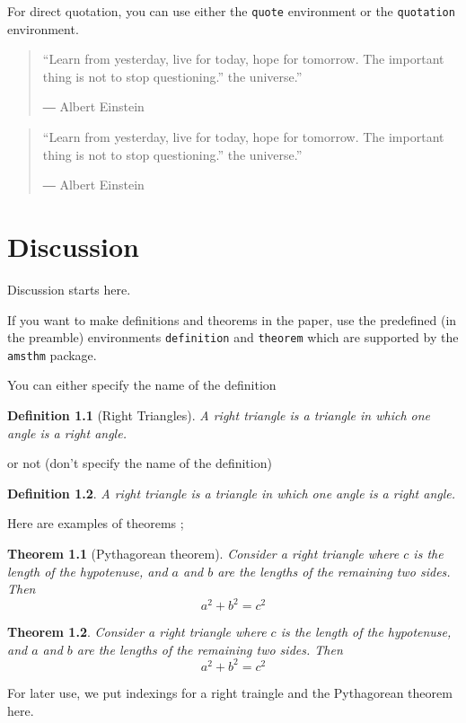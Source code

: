 \documentclass{report}
\newtheorem{theorem}{Theorem} %
\newtheorem{definition}{Definition} %
\begin{document}
For direct quotation, you can use either the \texttt{quote} environment or the \texttt{quotation} environment.
\begin{quote}
“Learn from yesterday, live for today, hope for tomorrow. The important thing is not to stop questioning.” the universe.” \par
― Albert Einstein 
\end{quote}

\begin{quotation}
“Learn from yesterday, live for today, hope for tomorrow. The important thing is not to stop questioning.” the universe.” \par
― Albert Einstein 
\end{quotation}


\chapter{Discussion}\label{chap:discussion}
Discussion starts here.

If you want to make definitions and theorems in the paper, use the predefined (in the preamble) environments \texttt{definition} and \texttt{theorem} which are supported by the \texttt{amsthm} package.

You can either specify the name of the definition
\begin{definition}[Right Triangles]
A right triangle is a triangle in which one angle is a right angle.
\end{definition}
or not (don't specify the name of the definition)
\begin{definition}
A right triangle is a triangle in which one angle is a right angle.
\end{definition}

Here are examples of theorems ;
\begin{theorem}[Pythagorean theorem]
Consider a right triangle where \(c\) is the length of the hypotenuse, and \(a\) and \(b\) are the lengths of the remaining two sides.
Then
\begin{equation}
a^2+b^2=c^2
\end{equation}
\end{theorem}

\begin{theorem}
Consider a right triangle where \(c\) is the length of the hypotenuse, and \(a\) and \(b\) are the lengths of the remaining two sides.
Then
\begin{equation}
a^2+b^2=c^2
\end{equation}
\end{theorem}
For later use, we put indexings for a right traingle and the Pythagorean theorem here.
\end{document}

